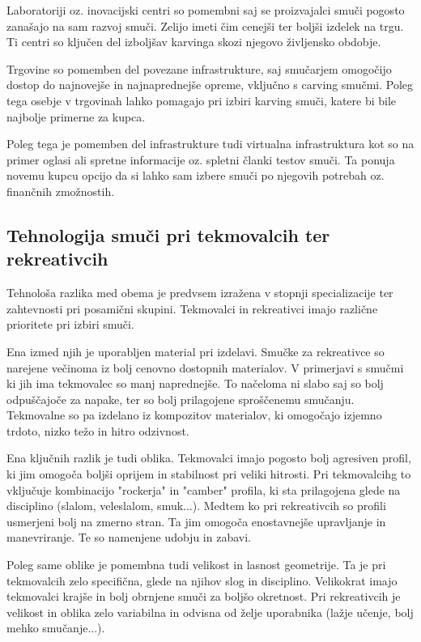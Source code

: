 \documentclass{article}
\begin{document}
Laboratoriji oz. inovacijski centri so pomembni saj se proizvajalci smuči pogosto zanašajo na sam razvoj smuči.
Zelijo imeti čim cenejši ter boljši izdelek na trgu. Ti centri so ključen del izboljšav karvinga skozi njegovo življensko obdobje.

Trgovine so pomemben del povezane infrastrukture, saj smučarjem omogočijo dostop do najnovejše in najnaprednejše opreme, vključno s carving smučmi. 
Poleg tega osebje v trgovinah lahko pomagajo pri izbiri karving smuči, katere bi bile najbolje primerne za kupca.

Poleg tega je pomemben del infrastrukture tudi virtualna infrastruktura kot so na primer oglasi ali spretne informacije oz. spletni članki testov smuči.
Ta ponuja novemu kupcu opcijo da si lahko sam izbere smuči po njegovih potrebah oz. finančnih zmožnostih.

\subsection*{Tehnologija smuči pri tekmovalcih ter rekreativcih}
Tehnološa razlika med obema je predvsem izražena v stopnji specializacije ter zahtevnosti pri posamični skupini.
Tekmovalci in rekreativci imajo različne prioritete pri izbiri smuči.

Ena izmed njih je uporabljen material pri izdelavi. Smučke za rekreativce so narejene večinoma iz bolj cenovno dostopnih materialov. 
V primerjavi s smučmi ki jih ima tekmovalec so manj naprednejše. To načeloma ni slabo saj so bolj odpuščajoče za napake, ter so bolj prilagojene sproščenemu smučanju.
Tekmovalne so pa izdelano iz kompozitov materialov, ki omogočajo izjemno trdoto, nizko težo in hitro odzivnost. 

Ena ključnih razlik je tudi oblika. Tekmovalci imajo pogosto bolj agresiven profil, ki jim omogoča boljši oprijem in stabilnost pri veliki hitrosti.
Pri tekmovalcihg to vključuje kombinacijo "rockerja" in "camber" profila, ki sta prilagojena glede na disciplino (slalom, veleslalom, smuk...).
Medtem ko pri rekreativcih so profili usmerjeni bolj na zmerno stran. Ta jim omogoča enostavnejše upravljanje in manevriranje. 
Te so namenjene udobju in zabavi.

Poleg same oblike je pomembna tudi velikost in lasnost geometrije. Ta je pri tekmovalcih zelo specifična, glede na njihov slog in disciplino.
Velikokrat imajo tekmovalci krajše in bolj obrnjene smuči za boljšo okretnost.
Pri rekreativcih je velikost in oblika zelo variabilna in odvisna od želje uporabnika (lažje učenje, bolj mehko smučanje...).
\end{document}
